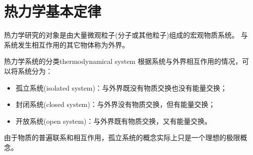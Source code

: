 \newcommand{\pu}[3][{}]{\biggkh{\pv{#2}{#3}}_{#1}}

\chapter{热力学基本定律}


热力学研究的对象是由大量微观粒子(分子或其他粒子)组成的宏观物质系统。
与系统发生相互作用的其它物体称为外界。

\begin{definition}
	{热力学系统的分类}{thermodynamical system}
	根据系统与外界相互作用的情况，可以将系统分为：
	\begin{itemize}
		\item 孤立系统(isolated system)：与外界既没有物质交换也没有能量交换；
		\item 封闭系统(closed system)：与外界没有物质交换，但有能量交换；
		\item 开放系统(open system)：与外界既有物质交换，又有能量交换。
	\end{itemize}
\end{definition}

\begin{remark}
	由于物质的普遍联系和相互作用，孤立系统的概念实际上只是一个理想的极限概念。
\end{remark}


